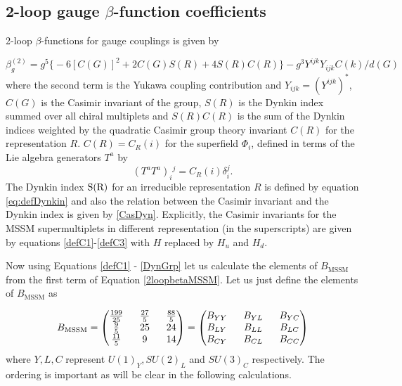 \documentclass[11pt,prd,superscriptaddress,nofootinbib]{revtex4-1}
\numberwithin{equation}{section}
\newcommand{\be}{\begin{equation}}
\newcommand{\ee}{\end{equation}}
\def\b{\beta}
\begin{document}
\subsection{2-loop gauge $\b$-function coefficients}

2-loop $\b$-functions for gauge couplings is given by \cite{Martin:1993zk}

\be \label{2loopbetaMSSM}
\b_g^(2) = g^5 \big\{-6[C(G)]^2 + 2C(G)S(R) + 4S(R)C(R)\big\} - g^3 Y^{ ijk}Y_{ijk}C(k)/d(G) 
\ee
where the second term is the Yukawa coupling contribution and  $Y_{ijk} = (Y^{ijk})^*$, $C(G)$ is the Casimir invariant of the group, $S(R)$ is the Dynkin index summed over all chiral multiplets and $S(R)C(R)$ is the sum of the Dynkin indices weighted by the quadratic Casimir group theory invariant $C(R)$ for the representation $R$. $C(R)=C_R(i)$ for the superfield $\Phi_i$, defined in terms of the Lie algebra generators $T^a$
by 
\be
(T^aT^a)_i{}^{j}= C_R(i) \delta_i^j .
\label{eq:defCasimir}
\ee
The Dynkin index $\rm S(R)$ for an irreducible representation $R$ is defined by equation \ref{eq:defDynkin} and also the relation between the Casimir invariant and the Dynkin index is given by \ref{CasDyn}. Explicitly, the Casimir invariants for the MSSM supermultiplets in different representation (in the superscripts) are given by equations \ref{defC1}-\ref{defC3} with $H$ replaced by $H_u$ and $H_d$.

Now using Equations \ref{defC1} - \ref{DynGrp} let us calculate the elements of $B_{\mathrm{MSSM}}$ from the first term of Equation \ref{2loopbetaMSSM}. Let us just define the elements of $B_{\mathrm{MSSM}}$ as 

\be \label{MSSMBMat}
B_{\mathrm{MSSM}}=\begin{pmatrix}\frac{199}{25}&
~~\frac{27}{5}& ~~\frac{88}{5}\cr \frac{9}{5} & ~~25& ~~24 \cr
\frac{11}{5}& ~~9& ~~14 \end{pmatrix}=\begin{pmatrix}B_{YY}&~~
B_{YL}& ~~B_{YC}\cr B_{LY} & ~~B_{LL}& ~~B_{LC} \cr
B_{CY} & ~~B_{CL} & ~~B_{CC} \end{pmatrix}
\ee
where $Y, L, C$ represent $U(1)_Y, SU(2)_L$ and $SU(3)_C$ respectively. The ordering is important as will be clear in the following calculations.
\end{document}
